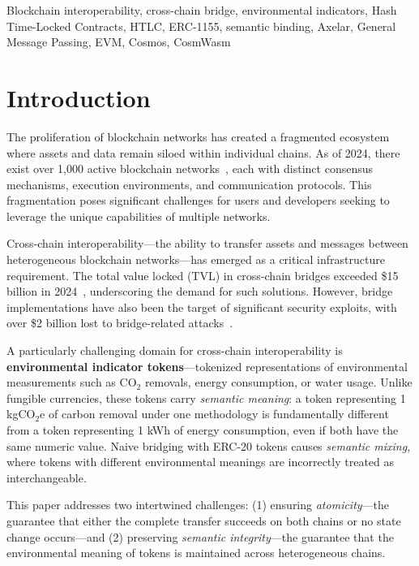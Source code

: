 \documentclass[conference,10pt]{IEEEtran}
\begin{document}
\begin{IEEEkeywords}
Blockchain interoperability, cross-chain bridge, environmental indicators, Hash Time-Locked Contracts, HTLC, ERC-1155, semantic binding, Axelar, General Message Passing, EVM, Cosmos, CosmWasm
\end{IEEEkeywords}

\section{Introduction}
\label{sec:introduction}

The proliferation of blockchain networks has created a fragmented ecosystem where assets and data remain siloed within individual chains. As of 2024, there exist over 1,000 active blockchain networks~\cite{defillama2024}, each with distinct consensus mechanisms, execution environments, and communication protocols. This fragmentation poses significant challenges for users and developers seeking to leverage the unique capabilities of multiple networks.

Cross-chain interoperability---the ability to transfer assets and messages between heterogeneous blockchain networks---has emerged as a critical infrastructure requirement. The total value locked (TVL) in cross-chain bridges exceeded \$15 billion in 2024~\cite{l2beat2024}, underscoring the demand for such solutions. However, bridge implementations have also been the target of significant security exploits, with over \$2 billion lost to bridge-related attacks~\cite{chainalysis2024}.

A particularly challenging domain for cross-chain interoperability is \textbf{environmental indicator tokens}---tokenized representations of environmental measurements such as CO$_2$ removals, energy consumption, or water usage. Unlike fungible currencies, these tokens carry \textit{semantic meaning}: a token representing 1 kgCO$_2$e of carbon removal under one methodology is fundamentally different from a token representing 1 kWh of energy consumption, even if both have the same numeric value. Naive bridging with ERC-20 tokens causes \textit{semantic mixing}, where tokens with different environmental meanings are incorrectly treated as interchangeable.

This paper addresses two intertwined challenges: (1) ensuring \textit{atomicity}---the guarantee that either the complete transfer succeeds on both chains or no state change occurs---and (2) preserving \textit{semantic integrity}---the guarantee that the environmental meaning of tokens is maintained across heterogeneous chains.
\end{document}
